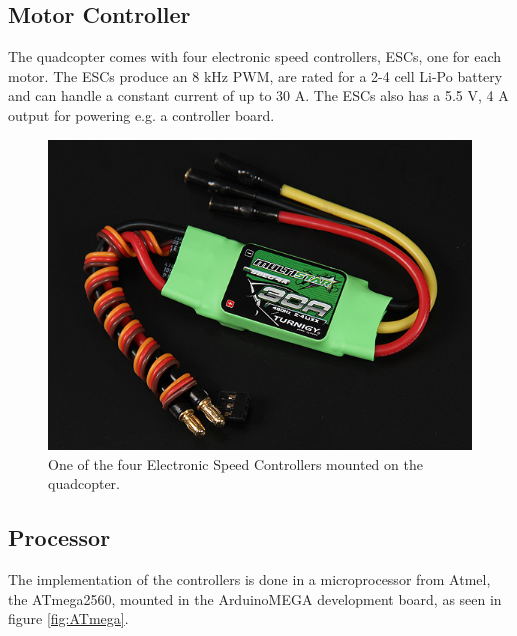 
 
\subsection{Motor Controller}
The quadcopter comes with four electronic speed controllers, ESCs, one for each motor. The ESCs produce an 8 kHz PWM, are rated for a 2-4 cell Li-Po battery and can handle a constant current of up to 30 A. The ESCs also has a 5.5 V, 4 A output for powering e.g. a controller board.\cite{HKing}

\begin{figure}[H]
	\centering
	\includegraphics[scale=0.4]{figures/ESC}
	\caption{One of the four Electronic Speed Controllers mounted on the quadcopter.\cite{HKing}}
	\label{fig:esc}
\end{figure}
\subsection{Processor}
The implementation of the controllers is done in a microprocessor from Atmel, the ATmega2560, mounted in the ArduinoMEGA development board, as seen in figure \autoref{fig:ATmega}.

